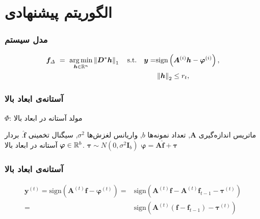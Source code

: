\section{الگوریتم پیشنهادی\hfill}
\begin{frame}
\frametitle{مدل سیستم}
\begin{figure}
	\centering
	
\end{figure}

\begin{block}{}
\begin{align*}
\label{eq:SSR}
 \bm{f}_{\varDelta}~=~\mathop{\arg\min}_{\bm{h}\in \mathbb{R}^{n} } \left\lVert\bm{D}^{*}\bm{h}\right\rVert_{1}\quad \text{s.t.} \quad   \bm{y} =& \text{sign}\left(\bm{A}^{(i)}\bm{h}-\bm{\varphi}^{(i)} \right), \\
  & \left\lVert\bm{h}\right\rVert_{2}\leq  r_t,
\end{align*}
\end{block}

\end{frame}
\begin{frame}
\frametitle{آستانه‌ی ابعاد بالا}
\begin{algorithm}[H]
	\caption{$ \Phi $: مولد آستانه در ابعاد بالا}
	\label{alg:HDTG}
	\begin{algorithmic}[1]
		\renewcommand{\algorithmicrequire}{\textbf{ورودی:}}
		\renewcommand{\algorithmicensure}{\textbf{خروجی:}}
		\REQUIRE ماتریس اندازه‌گیری $ \bm{A} $, تعداد نمونه‌ها $ b $, واریانس لغزش‌ها $ \sigma^{2} $, سیگنال تخمینی $ \hat{\bm{f}} $.
		\ENSURE بردار آستانه در ابعاد بالا $\bm{\varphi}\in \mathbb{R}^{b}$.
		\STATE $ \bm{\tau}\sim N(0,\sigma^{2}\bm{I}_{b} ) $
		\STATE  $ \bm{\varphi}=\bm{A}\hat{\bm{f}}+\bm{\tau} $
	\end{algorithmic} 
\end{algorithm}
\end{frame}
\begin{frame}
\frametitle{آستانه‌ی ابعاد بالا}
\begin{small}
\begin{align*}
\bm{y}^{(t)}= \text{sign}\left( \bm{A}^{(t)}\bm{f}- \bm{\varphi}^{(t)}\right) =& \text{sign}\left( \bm{A}^{(t)}\bm{f}- \bm{A}^{(t)}\bm{f}_{t-1}-\bm{\tau}^{(t)}\right) \\
=&\text{sign}\left( \bm{A}^{(t)}\left(\bm{f}-\bm{f}_{t-1}\right)-\bm{\tau}^{(t)}\right)
\end{align*}
\end{small}
\end{frame}
